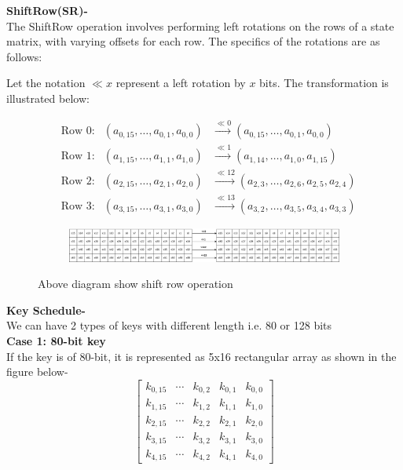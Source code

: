 \documentclass[journal=tosc,preprint]{iacrtrans}
\begin{document}
\textbf{ShiftRow(SR)-}\\
The ShiftRow operation involves performing left rotations on the rows of a state matrix, with varying offsets for each row. The specifics of the rotations are as follows:

Let the notation $\ll x$ represent a left rotation by $x$ bits. The transformation is illustrated below:

\[
\begin{aligned}
    &\text{Row 0:} & (a_{0,15}, \dots, a_{0,1}, a_{0,0}) & \xrightarrow{\ll 0} (a_{0,15}, \dots, a_{0,1}, a_{0,0}) \\
    &\text{Row 1:} & (a_{1,15}, \dots, a_{1,1}, a_{1,0}) & \xrightarrow{\ll 1} (a_{1,14}, \dots, a_{1,0}, a_{1,15}) \\
    &\text{Row 2:} & (a_{2,15}, \dots, a_{2,1}, a_{2,0}) & \xrightarrow{\ll 12} (a_{2,3}, \dots, a_{2,6}, a_{2,5}, a_{2,4}) \\
    &\text{Row 3:} & (a_{3,15}, \dots, a_{3,1}, a_{3,0}) & \xrightarrow{\ll 13} (a_{3,2}, \dots, a_{3,5}, a_{3,4}, a_{3,3})
\end{aligned}
\]

\begin{figure}[h!]
    \centering
    \begin{subfigure}[b]{1.2\textwidth}
        \centering
        \includegraphics[width=\textwidth]{SR.drawio.png} 
        \label{fig:image1}
    \end{subfigure}
    \caption{Above diagram show shift row operation}
    \label{fig:two_images}
\end{figure}

\textbf{Key Schedule-}\\
We can have 2 types of keys with different length i.e. 80 or 128 bits\\
\textbf{Case 1: 80-bit key}\\
If the key is of 80-bit, it is represented as 5x16 rectangular array as shown in the figure below-\\

\[
\begin{bmatrix}
k_{0,15} & \cdots & k_{0,2} & k_{0,1} & k_{0,0} \\
k_{1,15} & \cdots & k_{1,2} & k_{1,1} & k_{1,0} \\
k_{2,15} & \cdots & k_{2,2} & k_{2,1} & k_{2,0} \\
k_{3,15} & \cdots & k_{3,2} & k_{3,1} & k_{3,0} \\
k_{4,15} & \cdots & k_{4,2} & k_{4,1} & k_{4,0}
\end{bmatrix}
\]
\end{document}
